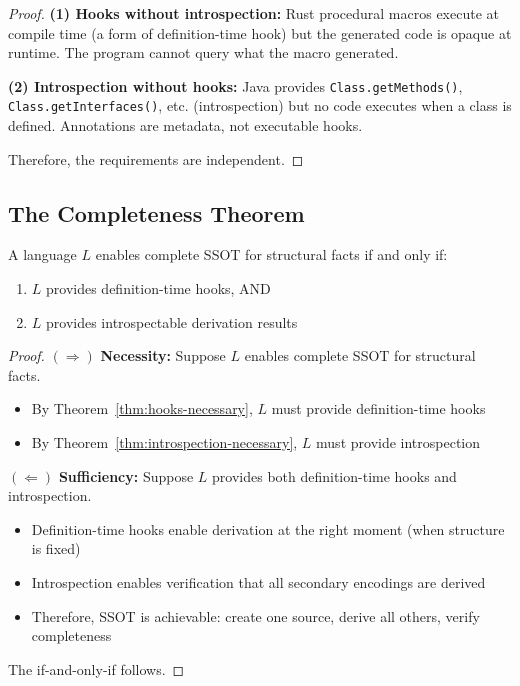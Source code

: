 \begin{proof}
\textbf{(1) Hooks without introspection:} Rust procedural macros execute at compile time (a form of definition-time hook) but the generated code is opaque at runtime. The program cannot query what the macro generated.

\textbf{(2) Introspection without hooks:} Java provides \texttt{Class.getMethods()}, \texttt{Class.getInterfaces()}, etc. (introspection) but no code executes when a class is defined. Annotations are metadata, not executable hooks.

Therefore, the requirements are independent.
\end{proof}

\subsection{The Completeness Theorem}\label{sec:completeness}

\begin{theorem}\label{thm:ssot-iff}
A language $L$ enables complete SSOT for structural facts if and only if:
\begin{enumerate}
\tightlist
\item $L$ provides definition-time hooks, AND
\item $L$ provides introspectable derivation results
\end{enumerate}
\end{theorem}

\begin{proof}
$(\Rightarrow)$ \textbf{Necessity:} Suppose $L$ enables complete SSOT for structural facts.
\begin{itemize}
\tightlist
\item By Theorem~\ref{thm:hooks-necessary}, $L$ must provide definition-time hooks
\item By Theorem~\ref{thm:introspection-necessary}, $L$ must provide introspection
\end{itemize}

$(\Leftarrow)$ \textbf{Sufficiency:} Suppose $L$ provides both definition-time hooks and introspection.
\begin{itemize}
\tightlist
\item Definition-time hooks enable derivation at the right moment (when structure is fixed)
\item Introspection enables verification that all secondary encodings are derived
\item Therefore, SSOT is achievable: create one source, derive all others, verify completeness
\end{itemize}

The if-and-only-if follows.
\end{proof}

